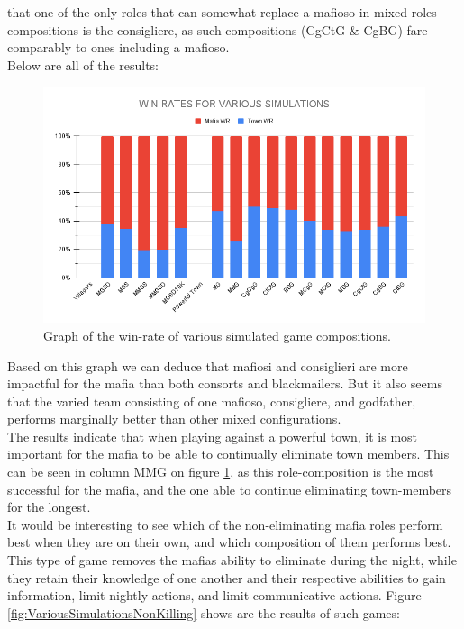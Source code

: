 that one of the only roles that can somewhat replace a mafioso in mixed-roles
compositions is the consigliere, as such compositions (CgCtG \& CgBG) fare
comparably to ones including a mafioso. \\ Below are all of the results:
\begin{figure}[H]
    \includegraphics[width=1\linewidth]{figures/Winrates}
    \caption{Graph of the win-rate of various 
    simulated game compositions.}
    \label{fig:VariousSimulations}
\end{figure}
\vspace{-5px}Based on this graph we can deduce that mafiosi and
consiglieri are more
impactful for the mafia than both consorts and blackmailers. But it also seems
that the varied team consisting of one mafioso, consigliere, and godfather,
performs marginally better than other mixed configurations. \\
The results indicate that when playing 
against a powerful town, it is most
important for the mafia to be able to 
continually eliminate town members. This can 
be seen in column MMG on figure 
\ref{fig:VariousSimulations}, as this 
role-composition is the most successful for 
the mafia, and the one able to continue 
eliminating town-members for the longest.\\
It would be interesting to see which of the non-eliminating mafia roles perform
best when they are on their own, and which composition of them performs best.
This type of game removes the mafias ability to eliminate during the night, while
they retain their knowledge of one another and their respective abilities to
gain information, limit nightly actions, and limit communicative actions. Figure \ref{fig:VariousSimulationsNonKilling} shows
are the results of such games:
